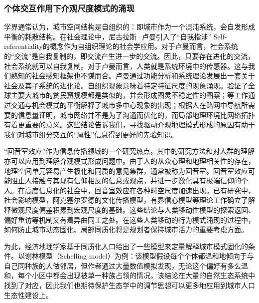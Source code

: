 \subsubsection{个体交互作用下介观尺度模式的涌现}

学界通常认为，城市空间结构是自组织的：即城市作为一个混沌系统，会自发形成平衡的耗散结构。在社会理论中，尼古拉斯·卢曼引入了“自我指涉” Self-referentiality的概念作为自组织理论的社会学应用\cite{luhmann1984soziale}。对于卢曼而言，社会系统的“交流”是自我复制的，即交流产生进一步的交流。因此，只要存在进化的交流，社会系统就可以自我复制。对于卢曼而言，人类就是系统环境中的传感器。这与我们熟知的社会感知框架也不谋而合。卢曼通过功能分析和系统理论发展出一套关于社会及其子系统的进化论。自组织现象意味着特定特征尺度的现象涌现。\cite{friesen2018similar, pelz2019similar}验证了全球主要大城市的贫民窟规模都是类似的，并会形成图灵不稳定性的图案；\cite{louf2013modeling, courtat2011mathematics}等工作通过交通与机会模式的平衡解释了城市多中心现象的出现；\cite{rosvall2005networks}根据人在路网中导航所需要的信息量证明，城市网络并不是为了沟通而优化的，而局部地理环境比网络拓扑有着更重要的意义。这些结论告诉我们，寻找驱动介观地理模式形成的原因有助于我们对城市组分交互的“属性”信息得到更好的先验知识。

“回音室效应”\cite{wang2020public, liu2020modeling}作为信息传播领域的一个研究热点，其中的研究方法和对人群的理解亦可以应用到理解介观模式形成问题中。由于人的从众心理和地理相关性的存在，地理空间单元容易产生极化和同质的意见集群，通常被称为回音室。回音室效应可能阻止人接触与其现有信仰相反的信息或观点，并进一步激化具有极端信仰的个人。在高度信息化的社会中，回音室效应在各种时空尺度加速出现\cite{wang2020public}。已有研究中，社会影响模型\cite{noah2006structural, friedkin2011social, parsegov2016novel}，阿克塞尔罗德的文化传播模型\cite{axelrod1997dissemination}，有界信心模型\cite{deffuant2000mixing}等理论工作确立了解释微观尺度偏差积累到宏观尺度的基础。这些结论与人类移动性模型的探索返回、偏好重访等机制又有着异曲同工之处\cite{song2010modelling, gonzalez2008understanding, brockmann2006scaling}。在这些人类移动的行为模式涌现的过程中，如何防止城市动态固化、局部同质化将是规划者保持城市活力的重要考虑方面。

为此，经济地理学家基于同质化人口给出了一些模型来定量解释城市模式固化的条件。以谢林模型（Schelling model）为例\cite{schelling1971dynamic}：该模型假设每个个体都温和地倾向于与自己同种族的人做邻居，但作者通过大量数值模拟发现，无论这个偏好有多么温和，每个小区中都会出现被单一种族占领的情况。该结论在大量的自然生态系统中找到了对应\cite{traulsen2006stochastic,baxter2008fixation,lombardo2015fixation}，因此我们也期待保护生态学中的调节思想可以更多地应用到城市人口生态性建设上。

